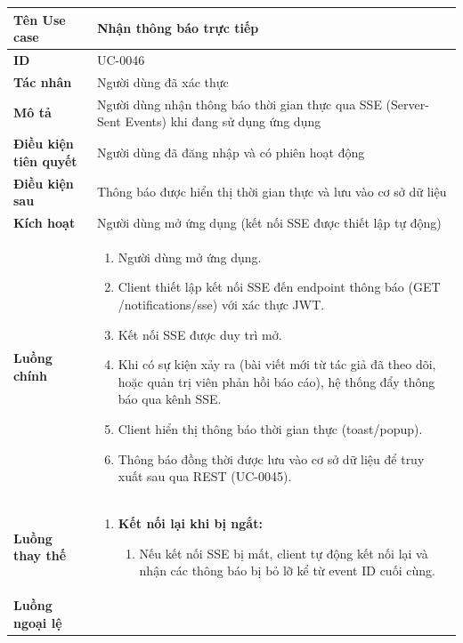 {
\renewcommand{\arraystretch}{1.5}

\begin{tabularx}{\textwidth}{|>{\raggedright\arraybackslash}X|>{\raggedright\arraybackslash}X|}
\hline
\textbf{Tên Use case} & Nhận thông báo trực tiếp \\
\hline
\textbf{ID} & UC-0046 \\
\hline
\textbf{Tác nhân} & Người dùng đã xác thực \\
\hline
\textbf{Mô tả} & Người dùng nhận thông báo thời gian thực qua SSE (Server-Sent Events) khi đang sử dụng ứng dụng \\
\hline
\textbf{Điều kiện tiên quyết} & Người dùng đã đăng nhập và có phiên hoạt động \\
\hline
\textbf{Điều kiện sau} & Thông báo được hiển thị thời gian thực và lưu vào cơ sở dữ liệu \\
\hline
\textbf{Kích hoạt} & Người dùng mở ứng dụng (kết nối SSE được thiết lập tự động) \\
\hline
\textbf{Luồng chính} &
\begin{enumerate}
    \item Người dùng mở ứng dụng.
    \item Client thiết lập kết nối SSE đến endpoint thông báo (GET /notifications/sse) với xác thực JWT.
    \item Kết nối SSE được duy trì mở.
    \item Khi có sự kiện xảy ra (bài viết mới từ tác giả đã theo dõi, hoặc quản trị viên phản hồi báo cáo), hệ thống đẩy thông báo qua kênh SSE.
    \item Client hiển thị thông báo thời gian thực (toast/popup).
    \item Thông báo đồng thời được lưu vào cơ sở dữ liệu để truy xuất sau qua REST (UC-0045).
\end{enumerate} \\
\hline
\textbf{Luồng thay thế} &
\begin{enumerate}
    \item \textbf{Kết nối lại khi bị ngắt:}
    \begin{enumerate}
        \item[3A.] Nếu kết nối SSE bị mất, client tự động kết nối lại và nhận các thông báo bị bỏ lỡ kể từ event ID cuối cùng.
    \end{enumerate}
\end{enumerate} \\
\hline
\textbf{Luồng ngoại lệ} &
\begin{enumerate}

\end{enumerate}
\end{tabularx}}
